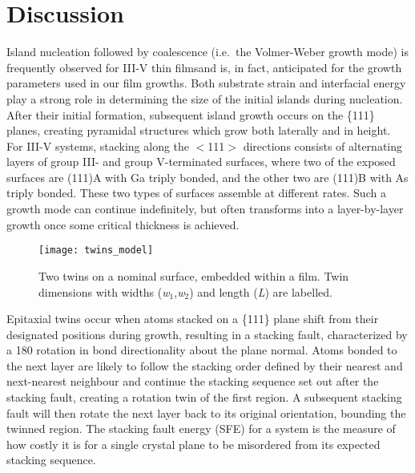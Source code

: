 \section{Discussion}
Island nucleation followed by coalescence (i.e.\ the Volmer-Weber growth mode) is frequently observed for III-V thin films\cite{Ernst1989,Fang1990,Kim2010,Akahane2004}and is, in fact, anticipated for the growth parameters used in our film growths.
Both substrate strain and interfacial energy play a strong role in determining the size of the initial islands during nucleation.
After their initial formation, subsequent island growth occurs on the \{111\} planes, creating pyramidal structures which grow both laterally and in height.
For III-V systems, stacking along the \(<\)111\(>\) directions consists of alternating layers of group III- and group V-terminated surfaces, where two of the exposed surfaces are (111)A with Ga triply bonded, and the other two are (111)B with As triply bonded.
These two types of surfaces assemble at different rates.
Such a growth mode can continue indefinitely, but often transforms into a layer-by-layer growth once some critical thickness is achieved\cite{Tersoff1994}.
\begin{figure}
 \centering \texttt{[image: twins\_model]}
 \caption[Model of twins on a (100) surface]{\label{fig:twins_model}Two twins on a nominal surface, embedded within a film.
  Twin dimensions with widths (\textit{w}\(_1\),\textit{w}\(_2\)) and length (\textit{L}) are labelled.}
\end{figure}
Epitaxial twins occur when atoms stacked on a \{111\} plane shift from their designated positions during growth, resulting in a stacking fault, characterized by a 180\degree{} rotation in bond directionality about the plane normal.
Atoms bonded to the next layer are likely to follow the stacking order defined by their nearest and next-nearest neighbour and continue the stacking sequence set out after the stacking fault, creating a rotation twin of the first region.
A subsequent stacking fault will then rotate the next layer back to its original orientation, bounding the twinned region.
The stacking fault energy (SFE) for a system is the measure of how costly it is for a single crystal plane to be misordered from its expected stacking sequence.

